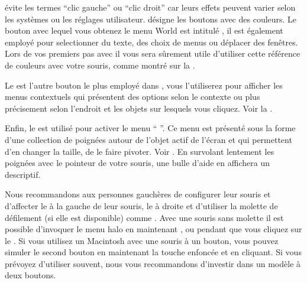 \documentclass[a4paper,10pt,twoside]{book}
\begin{document}
\sq évite les termes ``clic gauche'' ou ``clic droit'' car leurs effets peuvent varier selon les systèmes ou les réglages utilisateur. \sq désigne les boutons avec des couleurs. Le bouton avec lequel vous obtenez le menu World est intitulé , il est également employé pour selectionner du texte, des choix de menus ou déplacer des fenêtres. Lors de vos premiers pas avec \sq il vous sera sûrement utile d'utiliser cette référence de couleurs avec votre souris, comme montré sur la .

Le  est l'autre bouton le plus employé dans \sq, vous l'utiliserez pour afficher les menus contextuels qui présentent des options selon le contexte ou plus précisement selon l'endroit et les objets sur lesquels vous cliquez. Voir la .



Enfin, le  est utilisé pour activer le menu `` ''. Ce menu est présenté sous la forme d'une collection de poignées autour de l'objet actif de l'écran et qui permettent d'en changer la taille, de le faire pivoter. Voir . 
En survolant lentement les poignées avec le pointeur de votre souris, une bulle d'aide en affichera un descriptif.


Nous recommandons aux personnes gauchères de configurer leur souris et d'affecter le  à la gauche de leur souris, le  à droite et d'utiliser la molette de défilement (si elle est disponible) comme .
Avec une souris sans molette il est possible d'invoquer le menu halo en maintenant 
,  ou  pendant que vous cliquez sur le .
Si vous utilisez un Macintosh avec une souris à un bouton, vous pouvez simuler le second bouton en maintenant la touche \clover{} enfoncée et en cliquant. Si vous prévoyez d'utiliser \sq souvent, nous vous recommandons d'investir dans un modèle à deux boutons.
\end{document}
